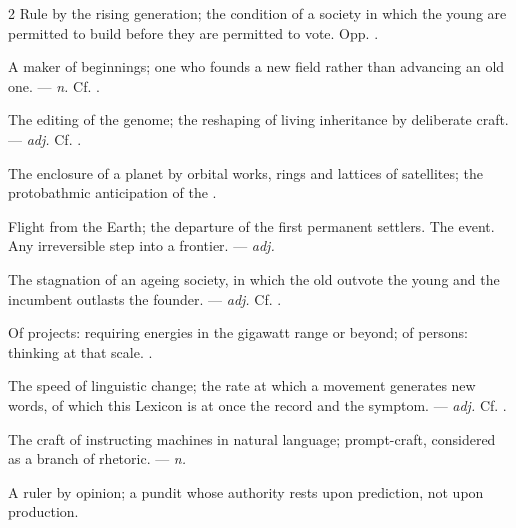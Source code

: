 \begin{multicols}{2}
 Rule by the rising generation; the condition of a society in which the young are permitted to build before they are permitted to vote. Opp. .

 A maker of beginnings; one who founds a new field rather than advancing an old one. —  \textit{n.} Cf. .

 The editing of the genome; the reshaping of living inheritance by deliberate craft.  —  \textit{adj.} Cf. .

 The enclosure of a planet by orbital works, rings and lattices of satellites; the protobathmic anticipation of the .

 Flight from the Earth; the departure of the first permanent settlers.  The event.   Any irreversible step into a frontier. —  \textit{adj.}

 The stagnation of an ageing society, in which the old outvote the young and the incumbent outlasts the founder. —  \textit{adj.} Cf. .

 Of projects: requiring energies in the gigawatt range or beyond; of persons: thinking at that scale. .

 The speed of linguistic change; the rate at which a movement generates new words, of which this Lexicon is at once the record and the symptom. —  \textit{adj.} Cf. .

 The craft of instructing machines in natural language; prompt-craft, considered as a branch of rhetoric.  —  \textit{n.}

  A ruler by opinion; a pundit whose authority rests upon prediction, not upon production.


\end{multicols}
